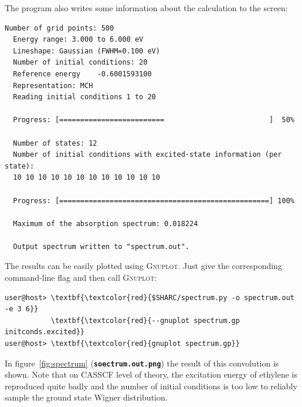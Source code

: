 \documentclass[a4paper,11pt,DIV=15,openany]{scrbook}
\newcommand{\ttt}[1]{\textbf{\texttt{#1}}}
\begin{document}
The program also writes some information about the calculation to the screen:
\begin{oframed}
\footnotesize\begin{Verbatim}[commandchars=\\\{\}]
  Number of grid points: 500
  Energy range: 3.000 to 6.000 eV
  Lineshape: Gaussian (FWHM=0.100 eV)
  Number of initial conditions: 20
  Reference energy    -0.6001593100
  Representation: MCH
  Reading initial conditions 1 to 20
  
  Progress: [=========================                         ]  50%
  
  Number of states: 12
  Number of initial conditions with excited-state information (per state):
  10 10 10 10 10 10 10 10 10 10 10 10 
  
  Progress: [==================================================] 100%
  
  Maximum of the absorption spectrum: 0.018224
  
  Output spectrum written to "spectrum.out".
\end{Verbatim}
\end{oframed}

\normalsize
The results can be easily plotted using \textsc{Gnuplot}. Just give the corresponding command-line flag and then call \textsc{Gnuplot}:
\begin{Verbatim}[commandchars=\\\{\}]
user@host> \textbf{\textcolor{red}{$SHARC/spectrum.py -o spectrum.out -e 3 6}}
           \textbf{\textcolor{red}{--gnuplot spectrum.gp initconds.excited}}
user@host> \textbf{\textcolor{red}{gnuplot spectrum.gp}}
\end{Verbatim}

In figure~\ref{fig:spectrum} (\ttt{soectrum.out.png}) the result of this convolution is shown. Note that on CASSCF level of theory, the excitation energy of ethylene is reproduced quite badly and the number of initial conditions is too low to reliably sample the ground state Wigner distribution.
\end{document}
